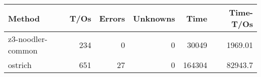 \begin{tabular}{lrrrrr}
\hline
 Method            &   T/Os &   Errors &   Unknowns &   Time &   Time-T/Os \\
\hline
 z3-noodler-common &    234 &        0 &          0 &  30049 &     1969.01 \\
 ostrich           &    651 &       27 &          0 & 164304 &    82943.7  \\
\hline
\end{tabular}
